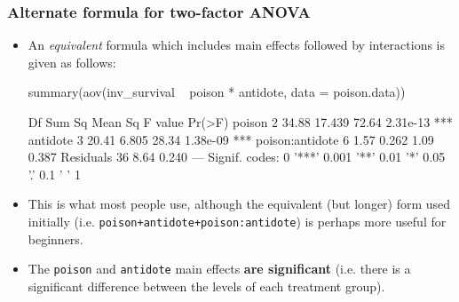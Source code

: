 \documentclass[a4paper]{article}\usepackage[]{graphicx}\usepackage[]{xcolor}
\begin{document}
\subsubsection{Alternate formula for two-factor ANOVA}
\begin{itemize}
	\item An \textit{equivalent} formula which includes main effects followed by interactions is given as follows:
\begin{Schunk}
\begin{Sinput}
summary(aov(inv_survival ~ poison * antidote, data = poison.data))
\end{Sinput}
\begin{Soutput}
                Df Sum Sq Mean Sq F value   Pr(>F)    
poison           2  34.88  17.439   72.64 2.31e-13 ***
antidote         3  20.41   6.805   28.34 1.38e-09 ***
poison:antidote  6   1.57   0.262    1.09    0.387    
Residuals       36   8.64   0.240                     
---
Signif. codes:  0 '***' 0.001 '**' 0.01 '*' 0.05 '.' 0.1 ' ' 1
\end{Soutput}
\end{Schunk}
	\item This is what most people use, although the equivalent (but longer) form used initially (i.e. \lstinline|poison+antidote+poison:antidote|) is perhaps more useful for beginners.
	\item The \lstinline|poison| and \lstinline|antidote| main effects \textbf{are significant} (i.e. there is a significant difference between the levels of each treatment group).
\end{itemize}
\end{document}
